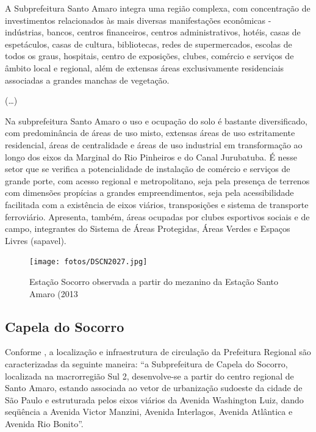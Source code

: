 	\begin{citacao}
		A Subprefeitura Santo Amaro integra uma região complexa, com concentração de investimentos relacionados às mais diversas manifestações econômicas - indústrias, bancos, centros financeiros, centros administrativos, hotéis, casas de espetáculos, casas de cultura, bibliotecas, redes de supermercados, escolas de todos os graus, hospitais, centro de exposições, clubes, comércio e serviços de âmbito local e regional, além de extensas áreas exclusivamente residenciais associadas a grandes manchas de vegetação.
		\cite[pág. 239]{planosul2}
		
		(\dots)
		
		Na subprefeitura Santo Amaro o uso e ocupação do solo é bastante diversificado, com predominância de áreas de uso misto, extensas áreas de uso estritamente residencial, áreas de centralidade e áreas de uso industrial em transformação ao longo dos eixos da Marginal do Rio Pinheiros e do Canal Jurubatuba. É nesse setor que se verifica a potencialidade de instalação de comércio e serviços de grande porte, com acesso regional e metropolitano, seja pela presença de terrenos com dimensões propícias a grandes empreendimentos, seja pela acessibilidade facilitada com a existência de eixos viários, transposições e sistema de transporte ferroviário. Apresenta, também, áreas ocupadas por clubes esportivos sociais e de campo, integrantes do Sistema de Áreas Protegidas, Áreas Verdes e Espaços Livres (\gls{sapavel}).
		\cite[pág. 243]{planosul2}
	\end{citacao}
	
	\begin{figure}[h]
		\caption{Estação Socorro observada a partir do mezanino da Estação Santo Amaro (2013}
		\texttt{[image: fotos/DSCN2027.jpg]}
	\end{figure}
	
	\subsection{Capela do Socorro}
	
	Conforme , a localização e infraestrutura de circulação da Prefeitura Regional são caracterizadas da seguinte maneira:	``a Subprefeitura de Capela do Socorro, localizada na macrorregião Sul 2, desenvolve-se a partir do centro regional de Santo Amaro, estando associada ao vetor de urbanização sudoeste da cidade de São Paulo e estruturada pelos eixos viários da Avenida Washington Luiz, dando seqüência a Avenida Victor Manzini, Avenida Interlagos, Avenida Atlântica e Avenida Rio Bonito''.
	
